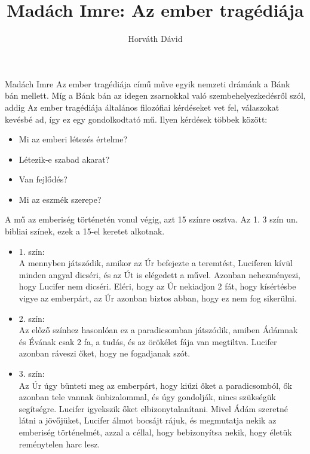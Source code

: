 \documentclass[]{article}
\title{Madách Imre: Az ember tragédiája}
\author{Horváth Dávid}
\begin{document}
	
	\maketitle
	
	Madách Imre Az ember tragédiája című műve egyik nemzeti drámánk a Bánk bán mellett. Míg a Bánk bán az idegen zsarnokkal való szembehelyezkedésről szól, addig Az ember tragédiája általános filozófiai kérdéseket vet fel, válaszokat kevésbé ad, így ez egy gondolkodtató mű. Ilyen kérdések többek között:
	\begin{itemize}
		\item Mi az emberi létezés értelme?
		\item Létezik-e szabad akarat?
		\item Van fejlődés?
		\item Mi az eszmék szerepe?
	\end{itemize}
	
	A mű az emberiség történetén vonul végig, azt 15 színre osztva. Az 1. 3 szín un. bibliai színek, ezek a 15-el keretet alkotnak.
	\begin{itemize}
		\item 1. szín:\\
			A mennyben játszódik, amikor az Úr befejezte a teremtést, Luciferen kívül minden angyal dicséri, és az Út is elégedett a művel. Azonban nehezményezi, hogy Lucifer nem dicséri. Eléri, hogy az Úr nekiadjon 2 fát, hogy kísértésbe vigye az emberpárt, az Úr azonban biztos abban, hogy ez nem fog sikerülni.
		\item 2. szín:\\
			Az előző színhez hasonlóan ez a paradicsomban játszódik, amiben Ádámnak és Évának csak 2 fa, a tudás, és az örökélet fája van megtiltva. Lucifer azonban ráveszi őket, hogy ne fogadjanak szót.
		\item 3. szín:\\
			Az Úr úgy bünteti meg az emberpárt, hogy kiűzi őket a paradicsomból, ők azonban tele vannak önbizalommal, és úgy gondolják, nincs szükségük segítségre. Lucifer igyekszik őket elbizonytalanítani. Mivel Ádám szeretné látni a jövőjüket, Lucifer álmot bocsájt rájuk, és megmutatja nekik az emberiség történelmét, azzal a céllal, hogy bebizonyítsa nekik, hogy életük reménytelen harc lesz.
	\end{itemize} 
\end{document}

